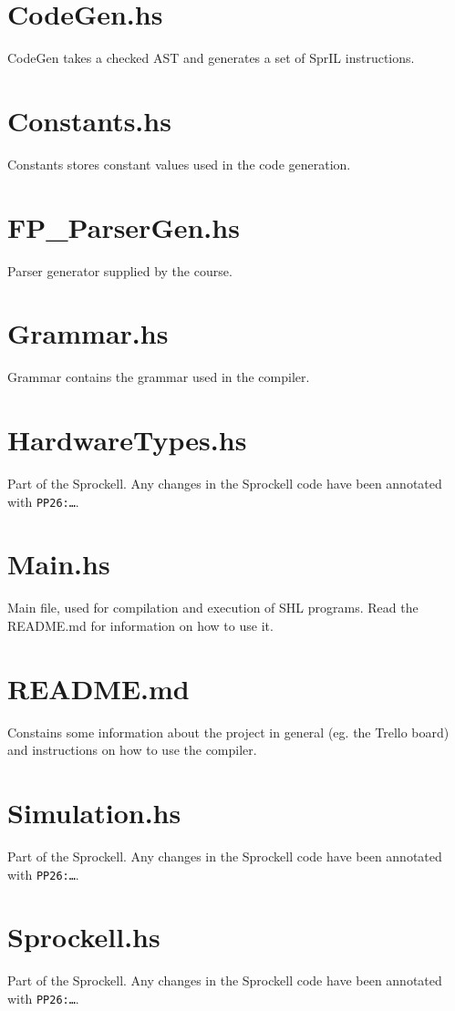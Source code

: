 \documentclass[twoside]{report}
\begin{document}
\section{CodeGen.hs}
CodeGen takes a checked AST and generates a set of SprIL instructions. %

\section{Constants.hs}
Constants stores constant values used in the code generation. %

\section{FP\_{}ParserGen.hs}
Parser generator supplied by the course.

\section{Grammar.hs}
Grammar contains the grammar used in the compiler.

\section{HardwareTypes.hs}
Part of the Sprockell. Any changes in the Sprockell code have been annotated with \texttt{PP26:\ldots}.

\section{Main.hs}
Main file, used for compilation and execution of SHL programs. Read the README.md for information on how to use it.

\section{README.md}
Constains some information about the project in general (eg. the Trello board) and instructions on how to use the compiler.

\section{Simulation.hs}
Part of the Sprockell. Any changes in the Sprockell code have been annotated with \texttt{PP26:\ldots}.

\section{Sprockell.hs}
Part of the Sprockell. Any changes in the Sprockell code have been annotated with \texttt{PP26:\ldots}.
\end{document}
